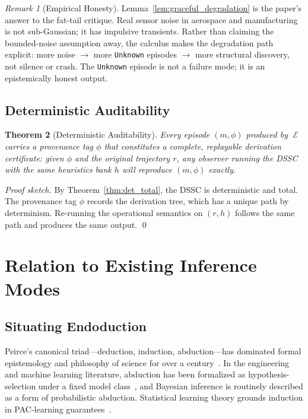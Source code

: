 \documentclass[11pt,a4paper]{article}
\theoremstyle{plain}
\newtheorem{theorem}{Theorem}[section]
\theoremstyle{definition}
\theoremstyle{remark}
\newtheorem{remark}[theorem]{Remark}
\DeclareMathOperator{\Endo}{\mathcal{E}}
\begin{document}
\begin{remark}[Empirical Honesty]
  Lemma~\ref{lem:graceful_degradation} is the paper's answer to the fat-tail critique. Real
  sensor noise in aerospace and manufacturing is not sub-Gaussian; it has impulsive transients.
  Rather than claiming the bounded-noise assumption away, the calculus makes the degradation
  path explicit: more noise $\to$ more \texttt{Unknown} episodes $\to$ more structural discovery,
  not silence or crash. The \texttt{Unknown} episode is not a failure mode; it is an
  epistemically honest output.
\end{remark}

\subsection{Deterministic Auditability}

\begin{theorem}[Deterministic Auditability]
\label{thm:audit}
  Every episode $(m, \phi)$ produced by $\Endo$ carries a provenance tag $\phi$ that
  constitutes a complete, replayable derivation certificate: given $\phi$ and the original
  trajectory $r$, any observer running the DSSC with the same heuristics bank $h$ will
  reproduce $(m, \phi)$ exactly.
\end{theorem}
\begin{proof}[Proof sketch]
  By Theorem~\ref{thm:det_total}, the DSSC is deterministic and total. The provenance tag
  $\phi$ records the derivation tree, which has a unique path by determinism. Re-running the
  operational semantics on $(r, h)$ follows the same path and produces the same output. \qed
\end{proof}

\section{Relation to Existing Inference Modes}
\label{sec:inference_modes}

\subsection{Situating Endoduction}

Peirce's canonical triad---deduction, induction, abduction---has dominated formal epistemology
and philosophy of science for over a century~\cite{peirce}. In the engineering and machine
learning literature, abduction has been formalized as hypothesis-selection under a fixed model
class~\cite{abduction_ml}, and Bayesian inference is routinely described as a form of
probabilistic abduction. Statistical learning theory grounds induction in PAC-learning
guarantees~\cite{pac_learning}.
\end{document}
